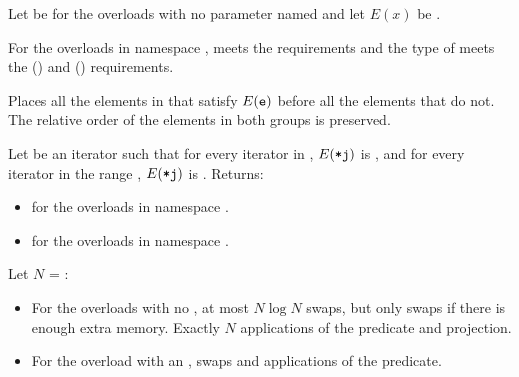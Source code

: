 \begin{itemdescr}
\pnum
Let  be 
for the overloads with no parameter named 
and let $E(x)$ be .

\pnum
\expects
For the overloads in namespace ,
 meets
the  requirements and
the type of  meets
the  () and
 () requirements.

\pnum
\effects
Places all the elements  in 
that satisfy $E(\texttt{e})$ before all the elements that do not.
The relative order of the elements in both groups is preserved.

\pnum
\returns
Let  be an iterator
such that for every iterator  in ,
$E(\texttt{*j})$ is ,
and for every iterator  in the range ,
$E(\texttt{*j})$ is .
Returns:
\begin{itemize}
\item {} for the overloads in namespace .
\item {} for the overloads in namespace .
\end{itemize}


\pnum
\complexity
Let $N$ = :
\begin{itemize}
\item
  For the overloads with no , at most $N \log N$ swaps,
  but only  swaps if there is enough extra memory.
  Exactly $N$ applications of the predicate and projection.
\item
  For the overload with an ,
   swaps and  applications of the predicate.
\end{itemize}
\end{itemdescr}


